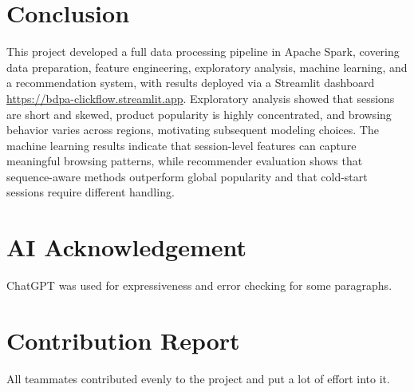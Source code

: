 \documentclass[a4paper,oneside,12pt]{book}
\let\Origclearpage\clearpage
\let\clearpage\relax
\begin{document}




\section{Conclusion}
This project developed a full data processing pipeline in Apache Spark, covering data preparation, feature engineering, exploratory analysis, machine learning, and a recommendation system, with results deployed via a Streamlit dashboard \url{https://bdpa-clickflow.streamlit.app}. Exploratory analysis showed that sessions are short and skewed, product popularity is highly concentrated, and browsing behavior varies across regions, motivating subsequent modeling choices. The machine learning results indicate that session-level features can capture meaningful browsing patterns, while recommender evaluation shows that sequence-aware methods outperform global popularity and that cold-start sessions require different handling.

\section{AI Acknowledgement}
ChatGPT was used for expressiveness and error checking for some paragraphs.

\section{Contribution Report}
All teammates contributed evenly to the project and put a lot of effort into it.

\vspace{1ex}
\nobreak


\begingroup
\renewcommand{\chapter}[2]{\section*{References}}
\setlength{\bibsep}{2pt}
\small


\endgroup

\let\clearpage\Origclearpage
\end{document}

